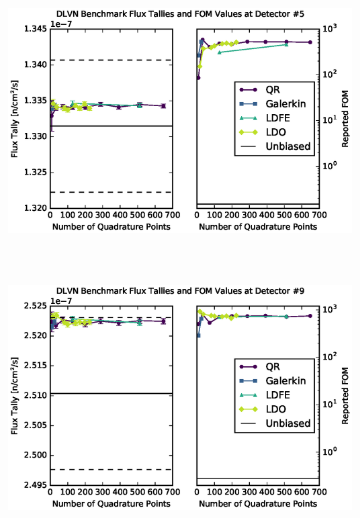 \documentclass{article} %
\begin{document}
\begin{figure}[!htb]
\begin{subfigure}{\linewidth}
\centering
\includegraphics[max height=0.445\textheight]
{img/dlvn-fwcadis-5.eps}
\label{dlvn-fwc-5}
\end{subfigure} 
\\
\begin{subfigure}{\linewidth}
\centering
\includegraphics[max height=0.445\textheight]
{img/dlvn-fwcadis-9.eps}
\label{dlvn-fwc-9}
\end{subfigure}
\end{figure}
\clearpage
\end{document}
